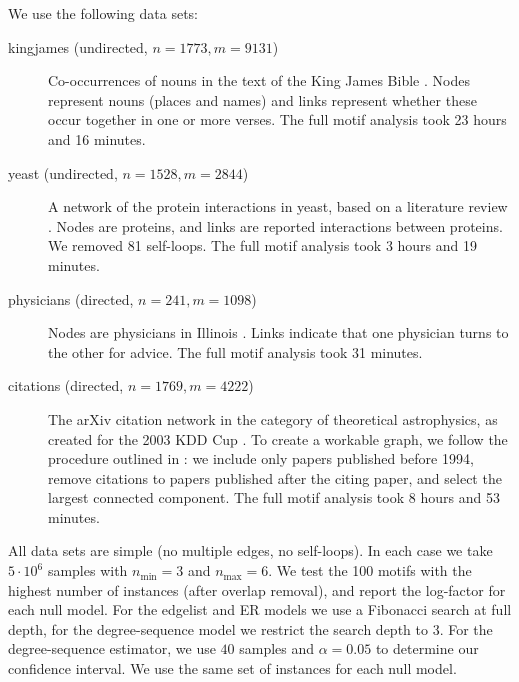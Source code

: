 \documentclass[twoside,11pt]{article}
\begin{document}
We use the following data sets:
\begin{description}
\item[kingjames (undirected, $n=1773, m=9131$)] Co-occurrences of nouns in the text of the King James Bible \citep{konect:2014:moreno_names,konect:harrison}. Nodes represent nouns (places and names) and links represent whether these occur together in one or more verses. The full motif analysis took 23 hours and 16 minutes. 
\item[yeast (undirected, $n=1528, m=2844$)] A network of the protein interactions in yeast, based on a literature review \citep{reguly2006comprehensive}. Nodes are proteins, and links are reported interactions between proteins. We removed 81 self-loops. The full motif analysis took 3 hours and 19 minutes. 
\item[physicians (directed, $n=241, m=1098$)] Nodes are physicians in Illinois \citep{konect:2015:moreno_innovation,konect:coleman1957}. Links indicate that one physician turns to the other for advice. The full motif analysis took 31 minutes. 
\item[citations (directed, $n=1769, m=4222$)] The arXiv citation network in the category of theoretical astrophysics, as created for the 2003 KDD Cup \citep{gehrke2003overview}. To create a workable graph, we follow the procedure outlined in \citet{carstens2013motifs}: we include only papers published before 1994, remove citations to papers published after the citing paper, and select the largest connected component. The full motif analysis took 8 hours and 53 minutes. 
\end{description}
All data sets are simple (no multiple edges, no self-loops). In each case we take $5 \cdot 10^6$ samples with $n_\text{min} = 3$ and $n_\text{max} = 6$. We test the 100 motifs with the highest number of instances (after overlap removal), and report the log-factor for each null model. For the edgelist and ER models we use a Fibonacci search at full depth, for the degree-sequence model we restrict the search depth to $3$. For the degree-sequence estimator, we use $40$ samples and $\alpha=0.05$ to determine our confidence interval. We use the same set of instances for each null model.
\end{document}
